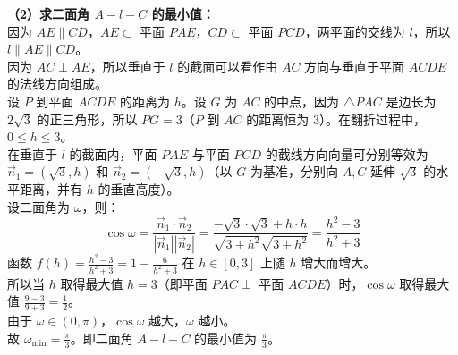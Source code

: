 {\textbf{（2）求二面角 $A-l-C$ 的最小值：}\\
因为 $AE \parallel CD$，$AE \subset$ 平面 $PAE$，$CD \subset$ 平面 $PCD$，两平面的交线为 $l$，所以 $l \parallel AE \parallel CD$。\\
因为 $AC \perp AE$，所以垂直于 $l$ 的截面可以看作由 $AC$ 方向与垂直于平面 $ACDE$ 的法线方向组成。\\
设 $P$ 到平面 $ACDE$ 的距离为 $h$。设 $G$ 为 $AC$ 的中点，因为 $\triangle PAC$ 是边长为 $2\sqrt{3}$ 的正三角形，所以 $PG = 3$（$P$ 到 $AC$ 的距离恒为 $3$）。在翻折过程中，$0 \le h \le 3$。\\
在垂直于 $l$ 的截面内，平面 $PAE$ 与平面 $PCD$ 的截线方向向量可分别等效为 $\vec{n}_1 = (\sqrt{3}, h)$ 和 $\vec{n}_2 = (-\sqrt{3}, h)$（以 $G$ 为基准，分别向 $A,C$ 延伸 $\sqrt{3}$ 的水平距离，并有 $h$ 的垂直高度）。\\
设二面角为 $\omega$，则：
\[
\cos\omega = \frac{\vec{n}_1 \cdot \vec{n}_2}{|\vec{n}_1||\vec{n}_2|} = \frac{-\sqrt{3} \cdot \sqrt{3} + h \cdot h}{\sqrt{3+h^2}\sqrt{3+h^2}} = \frac{h^2 - 3}{h^2 + 3}
\]
函数 $f(h) = \frac{h^2 - 3}{h^2 + 3} = 1 - \frac{6}{h^2 + 3}$ 在 $h \in [0, 3]$ 上随 $h$ 增大而增大。\\
所以当 $h$ 取得最大值 $h=3$（即平面 $PAC \perp$ 平面 $ACDE$）时，$\cos\omega$ 取得最大值 $\frac{9-3}{9+3} = \frac{1}{2}$。\\
由于 $\omega \in (0, \pi)$，$\cos\omega$ 越大，$\omega$ 越小。\\
故 $\omega_{\min} = \frac{\pi}{3}$。即二面角 $A-l-C$ 的最小值为 $\frac{\pi}{3}$。
}

\newcommand{\qSolidFoldingPentagonMinAngleTeachingNotes}{
\item \textbf{结构洞察}：本题的核心在于抓住不变量和几何结构。一是 $AE \parallel CD \implies l \parallel AE \parallel CD$ 的平行模型，从而将二面角转化为一个关于高度 $h$ 的代数最值问题。
\item \textbf{降维打击}：第一问中 $\overrightarrow{AH} \cdot \overrightarrow{CF} = 0$ 利用平面向量非常巧妙，避开了复杂的空间建系建坐标。建议在教案中引导学生观察 $F, H$ 投影到 $AC$ 上都在同一点 $G$。
\item \textbf{二面角的最值}：可以作为“建系与向量法”的进阶拔高。把截面上的方向向量抽离出来：$\vec{v}_1 = (\sqrt{3}, h)$ 和 $\vec{v}_2 = (-\sqrt{3}, h)$，利用 $\cos\omega = \frac{\vec{v}_1 \cdot \vec{v}_2}{|\vec{v}_1||\vec{v}_2|}$ 分析函数单调性。
}
